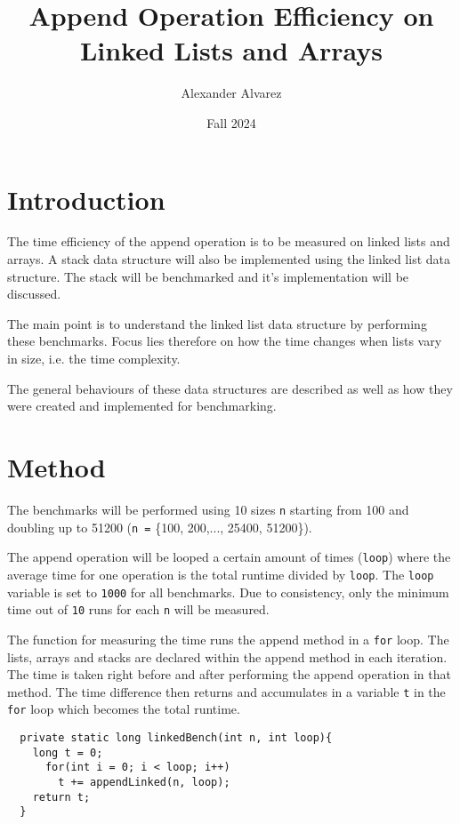 \documentclass[a4paper,11pt]{article}
\begin{document}
\title{
  \textbf{Append Operation Efficiency on Linked Lists and Arrays}
}
\author{Alexander Alvarez}
\date{Fall 2024}

\maketitle

\section*{Introduction}

The time efficiency of the append operation is to be measured on linked 
lists and arrays. A stack data structure will also be implemented using
the linked list data structure. The stack will be benchmarked and it's
implementation will be discussed.

The main point is to understand the linked list data structure by 
performing these benchmarks. Focus lies therefore on how the time 
changes when lists vary in size, i.e. the time complexity.

The general behaviours of these data structures are described as well 
as how they were created and implemented for benchmarking.

\section*{Method}

The benchmarks will be performed using 10 sizes {\tt n} starting from 
100 and doubling up to 51200 ({\tt n =} \{100, 200,..., 25400, 51200\}).

The append operation will be looped a certain amount of times 
({\tt loop}) where the average time for one operation is the total 
runtime divided by {\tt loop}. The {\tt loop} variable is set to 
{\tt 1000} for all benchmarks. Due to consistency, only the minimum 
time out of {\tt 10} runs for each {\tt n} will be measured.

The function for measuring the time runs the append method in a 
{\tt for} loop. The lists, arrays and stacks are declared within the 
append method in each iteration. The time is taken right before and 
after performing the append operation in that method. The time 
difference then returns and accumulates in a variable {\tt t} in the 
{\tt for} loop which becomes the total runtime. 

\begin{verbatim}
  private static long linkedBench(int n, int loop){
    long t = 0;
      for(int i = 0; i < loop; i++) 
        t += appendLinked(n, loop);
    return t;
  }
\end{verbatim}
\end{document}
